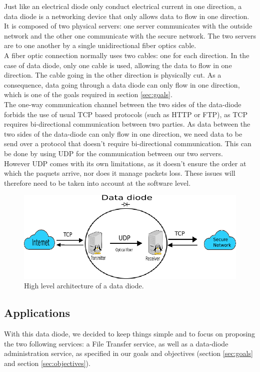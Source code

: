 \documentclass[a4paper,11pt]{article}
\begin{document}
Just like an electrical diode only conduct electrical current in one direction, a data diode is a networking device that only allows data to flow in one direction. It is composed of two physical servers: one server communicates with the outside network and the other one communicate with the secure network. The two servers are to one another by a single unidirectional fiber optics cable.\\

A fiber optic connection normally uses two cables: one for each direction. In the case of 	 data diode, only one cable is used, allowing the data to flow in one direction. The cable going in the other direction is physically cut. As a consequence, data going through a data diode can only flow in one direction, which is one of the goals required in section \ref{sec:goals}.\\

The one-way communication channel between the two sides of the data-diode forbids the use of usual TCP based protocols (such as HTTP or FTP), as TCP requires bi-directional communication between two parties. As data between the two sides of the data-diode can only flow in one direction, we need data to be send over a protocol that doesn't require bi-directional communication. This can be done by using UDP for the communication between our two servers.\\

However UDP comes with its own limitations, as it doesn't ensure the order at which the paquets arrive, nor does it manage packets loss. These issues will therefore need to be taken into account at the software level.


\begin{figure}
	\includegraphics[scale=0.7]{img/network.png}
	\caption{High level architecture of a data diode.}
\end{figure}


\subsection{Applications}
With this data diode, we decided to keep things simple and to focus on proposing the two following services: a File Transfer service, as well as a data-diode administration service, as specified in our goals and objectives (section \ref{sec:goals} and section \ref{sec:objectives}).\\
\end{document}
